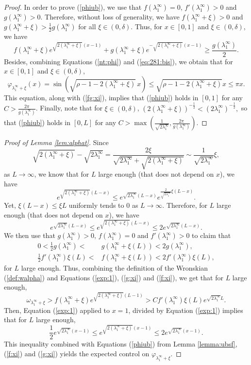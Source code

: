 \documentclass[11pt]{article}
\theoremstyle{plain}
\newcommand\linf{\lambda_1^\infty}
\begin{document}
\begin{appendix}
\begin{proof}
In order to prove (\ref{phiub}), we use  that $f(\linf)=0$, $f'(\linf)>0$ and $g(\linf)>0$. Therefore, without loss of generality, we have $f({\linf+\xi})>0$ and $g({\linf+\xi})>\frac{1}{2}g(\linf)$  for all $\xi\in(0,\delta)$.
Thus, for $x\in [0,1]$ and  ${\xi}\in(0,\delta)$, we have
\begin{equation}
f({\linf+\xi})e^{\sqrt{2({\linf+\xi})}(x-1)}+g({\linf+\xi})e^{-\sqrt{2({\linf+\xi})}(x-1)}\geqslant \frac{g(\linf)}{2}.\label{fg:xi}
\end{equation}
Besides, combining Equations (\ref{nt:phi}) and (\ref{eq:281:bis}), we obtain that for $x\in[0,1]$ and ${\xi}\in(0,\delta)$,  
$$\varphi_{\linf+\xi}(x)=\sin\left(\sqrt{\rho-1-2({\linf+\xi})}\,x\right)\leqslant \sqrt{\rho-1-2({\linf+\xi})} x \leqslant \pi x.$$
This equation, along with (\ref{fg:xi}), implies that (\ref{phiub}) holds in $[0,1]$ for any $C>\frac{2\pi}{g(\linf)}$. Finally, note that for  ${\xi}\in(0,\delta)$,
$\left(2({\linf+\xi})\right)^{-\frac{1}{2}}<\left(2\linf\right)^{-\frac{1}{2}},$
so that (\ref{phiub}) holds in $[0,L]$ for any $C>\max\left(\frac{1}{\sqrt{2\linf}},\frac{2\pi}{g(\linf)}\right).$
\end{proof}


\begin{proof}[Proof of Lemma \ref{lem:alphat}] Since $$\sqrt{2(\linf+\xi)}-\sqrt{2\linf}=\frac{2\xi}{\sqrt{2\linf}+\sqrt{2(\linf+\xi)}}\sim\frac{1}{\sqrt{2\linf}}\xi,$$ as $L\to\infty$, we know that for $L$ large enough (that does not depend on $x$), we have 
\begin{equation*}
e^{\sqrt{2(\linf+\xi)}(L-x)}\leqslant e^{\sqrt{2\linf}(L-x)}e^{\frac{2}{\sqrt{2\linf}}\xi (L-x)}.
\end{equation*}
Yet, $\xi(L-x)\leqslant \xi L$ uniformly tends to $0$ as $L\to\infty$. Therefore, for $L$ large enough (that does not depend on $x$), we have
\begin{equation}
 e^{ \sqrt{2\linf}(L-x)}\leqslant e^{ \sqrt{2(\linf+\xi)}(L-x)}\leqslant 2e^{\sqrt{2\linf}(L-x)}\label{exp:1}.
\end{equation}
We then use that $g(\linf)>0$, $f(\linf)=0$ and $f'(\linf)>0$ to claim that
\begin{align}
0<\frac{1}{2}g(\linf)<&g(\linf+\xi(L))<2g(\linf),\label{g:xi}\\
\frac{1}{2}f'(\linf)\xi(L)<&f(\linf+\xi(L))<2f'(\linf)\xi(L)\label{f:xi},
\end{align}
for $L$ large enough.
Thus, combining the definition of the Wronskian (\ref{def:walpha}) and Equations (\ref{exp:1}), (\ref{g:xi}) and (\ref{f:xi}), we get that for $L$ large enough,
\begin{equation*}
\omega_{\linf+\xi}>f(\linf+\xi)e^{\sqrt{2(\linf+\xi)}(L-1)}>Cf'(\linf)\xi(L)e^{\sqrt{2\linf}L}.
\end{equation*}
Then, Equation (\ref{exp:1}) applied to $x=1$, divided by Equation (\ref{exp:1}) implies that for $L$ large enough, 
$$\frac{1}{2}e^{\sqrt{2\linf}(x-1)}\leqslant e^{\sqrt{2(\linf+\xi)}(x-1)}\leqslant 2e^{\sqrt{2\linf}(x-1)}.$$ This inequality combined with Equations (\ref{phiub}) from Lemma \ref{lemma:ubsf}, (\ref{f:xi}) and (\ref{g:xi}) yields the expected control on $\varphi_{\linf+\xi}$.


\end{proof}
\end{appendix}
\end{document}
